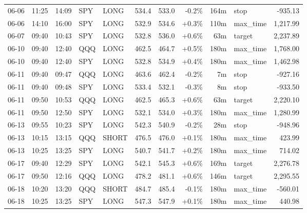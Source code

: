 \documentclass[11pt,a4paper,twoside]{article}
\begin{document}
\begin{center}
\begin{longtable}{>{\color{txtmain}}l l l l l r r r r >{\color{txtmain}}l r}
06-06 & 11:25 & 14:09 & SPY & LONG & 534.4 & 533.0 & \textcolor{lossred}{-0.2\%} & 164m & stop & \textcolor{lossred}{-935.13} \\
06-06 & 14:10 & 16:00 & SPY & LONG & 532.9 & 534.6 & \textcolor{wingreen}{+0.3\%} & 110m & max\_time & \textcolor{wingreen}{1,217.99} \\
06-07 & 09:40 & 10:43 & SPY & LONG & 532.8 & 536.0 & \textcolor{wingreen}{+0.6\%} & 63m & target & \textcolor{wingreen}{2,237.89} \\
06-10 & 09:40 & 12:40 & QQQ & LONG & 462.5 & 464.7 & \textcolor{wingreen}{+0.5\%} & 180m & max\_time & \textcolor{wingreen}{1,768.00} \\
06-10 & 09:40 & 12:40 & SPY & LONG & 532.8 & 534.9 & \textcolor{wingreen}{+0.4\%} & 180m & max\_time & \textcolor{wingreen}{1,462.98} \\
06-11 & 09:40 & 09:47 & QQQ & LONG & 463.6 & 462.4 & \textcolor{lossred}{-0.2\%} & 7m & stop & \textcolor{lossred}{-927.16} \\
06-11 & 09:40 & 09:48 & SPY & LONG & 533.4 & 532.1 & \textcolor{lossred}{-0.3\%} & 8m & stop & \textcolor{lossred}{-933.50} \\
06-11 & 09:50 & 10:53 & QQQ & LONG & 462.5 & 465.3 & \textcolor{wingreen}{+0.6\%} & 63m & target & \textcolor{wingreen}{2,220.10} \\
06-11 & 09:50 & 12:50 & SPY & LONG & 532.1 & 534.0 & \textcolor{wingreen}{+0.3\%} & 180m & max\_time & \textcolor{wingreen}{1,280.99} \\
06-13 & 09:55 & 10:23 & SPY & LONG & 542.3 & 540.9 & \textcolor{lossred}{-0.2\%} & 28m & stop & \textcolor{lossred}{-948.96} \\
06-13 & 10:15 & 13:15 & QQQ & SHORT & 476.5 & 476.0 & \textcolor{wingreen}{+0.1\%} & 180m & max\_time & \textcolor{wingreen}{423.99} \\
06-13 & 10:25 & 13:25 & SPY & LONG & 540.7 & 541.7 & \textcolor{wingreen}{+0.2\%} & 180m & max\_time & \textcolor{wingreen}{714.02} \\
06-17 & 09:40 & 12:29 & SPY & LONG & 542.1 & 545.3 & \textcolor{wingreen}{+0.6\%} & 169m & target & \textcolor{wingreen}{2,276.78} \\
06-17 & 09:50 & 12:16 & QQQ & LONG & 478.2 & 481.1 & \textcolor{wingreen}{+0.6\%} & 146m & target & \textcolor{wingreen}{2,295.55} \\
06-18 & 10:20 & 13:20 & QQQ & SHORT & 484.7 & 485.4 & \textcolor{lossred}{-0.1\%} & 180m & max\_time & \textcolor{lossred}{-560.01} \\
06-18 & 10:25 & 13:25 & SPY & LONG & 547.3 & 547.9 & \textcolor{wingreen}{+0.1\%} & 180m & max\_time & \textcolor{wingreen}{440.98} \\

\end{longtable}
\end{center}
\end{document}
